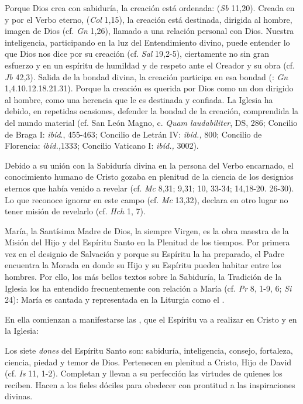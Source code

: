 	 Porque Dios crea con sabiduría, la creación está ordenada:  (\emph{Sb} 11,20). Creada en y por el Verbo eterno,  (\emph{Col} 1,15), la creación está destinada, dirigida al hombre, imagen de Dios (cf. \emph{Gn} 1,26), llamado a una relación personal con Dios. Nuestra inteligencia, participando en la luz del Entendimiento divino, puede entender lo que Dios nos dice por su creación (cf. \emph{Sal} 19,2-5), ciertamente no sin gran esfuerzo y en un espíritu de humildad y de respeto ante el Creador y su obra (cf. \emph{Jb} 42,3). Salida de la bondad divina, la creación participa en esa bondad (: \emph{Gn} 1,4.10.12.18.21.31). Porque la creación es querida por Dios como un don dirigido al hombre, como una herencia que le es destinada y confiada. La Iglesia ha debido, en repetidas ocasiones, defender la bondad de la creación, comprendida la del mundo material (cf. San León Magno, c. \emph{Quam laudabiliter}, DS, 286; Concilio de Braga I: \emph{ibíd}., 455-463; Concilio de Letrán IV: \emph{ibíd.,} 800; Concilio de Florencia: \emph{ibíd.,}1333; Concilio Vaticano I: \emph{ibíd.,} 3002).
	
	 Debido a su unión con la Sabiduría divina en la persona del Verbo encarnado, el conocimiento humano de Cristo gozaba en plenitud de la ciencia de los designios eternos que había venido a revelar (cf. \emph{Mc} 8,31; 9,31; 10, 33-34; 14,18-20. 26-30). Lo que reconoce ignorar en este campo (cf. \emph{Mc} 13,32), declara en otro lugar no tener misión de revelarlo (cf. \emph{Hch} 1, 7).
	
 María, la Santísima Madre de Dios, la siempre Virgen, es la obra maestra de la Misión del Hijo y del Espíritu Santo en la Plenitud de los tiempos. Por primera vez en el designio de Salvación y porque su Espíritu la ha preparado, el Padre encuentra la Morada en donde su Hijo y su Espíritu pueden habitar entre los hombres. Por ello, los más bellos textos sobre la Sabiduría, la Tradición de la Iglesia los ha entendido frecuentemente con relación a María (cf. \emph{Pr} 8, 1-9, 6; \emph{Si} 24): María es cantada y representada en la Liturgia como el .
	
En ella comienzan a manifestarse las , que el Espíritu va a realizar en Cristo y en la Iglesia:
	
	 Los siete \emph{dones} del Espíritu Santo son: sabiduría, inteligencia, consejo, fortaleza, ciencia, piedad y temor de Dios. Pertenecen en plenitud a Cristo, Hijo de David (cf. \emph{Is} 11, 1-2). Completan y llevan a su perfección las virtudes de quienes los reciben. Hacen a los fieles dóciles para obedecer con prontitud a las inspiraciones divinas.
	
